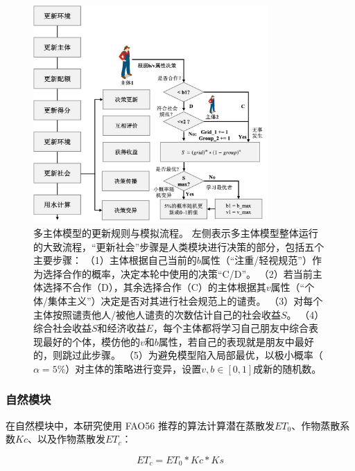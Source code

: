 \begin{figure}[!ht]
    \centering
    \includegraphics[width=0.8\textwidth]{img/ch6/ch6_updates_diagram.png}
    \caption[多主体模型的更新规则与模拟流程]{多主体模型的更新规则与模拟流程。
    左侧表示多主体模型整体运行的大致流程，“更新社会”步骤是人类模块进行决策的部分，包括五个主要步骤：
        （1）主体根据自己当前的$b$属性（“注重/轻视规范”）作为选择合作的概率，决定本轮中使用的决策“C/D”。
        （2）若当前主体选择不合作（D），其余选择合作（C）的主体根据其$v$属性（“个体/集体主义”）决定是否对其进行社会规范上的谴责。
        （3）对每个主体按照谴责他人/被他人谴责的次数估计自己的社会收益$S$。
        （4）综合社会收益$S$和经济收益$E$，每个主体都将学习自己朋友中综合表现最好的个体，模仿他的$v$和$b$属性，若自己的表现就是朋友中最好的，则跳过此步骤。
        （5）为避免模型陷入局部最优，以极小概率（$\alpha = 5\%$）对主体的策略进行变异，设置$v, b \in [0, 1]$成新的随机数。
    }\label{ch6:fig:society}
\end{figure}

\subsubsection{自然模块}

在自然模块中，本研究使用 FAO56 推荐的算法计算潜在蒸散发$ET_0$、作物蒸散系数$Kc$、以及作物蒸散发$ET_c$：

\begin{equation}
    ET_c = ET_0 * Kc * Ks
    \label{ch6:eq:etc}
\end{equation}

